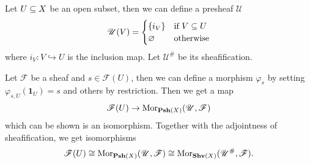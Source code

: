 \begin{example}\label{sheaf by open subset}
Let $U\subseteq X$ be an open subset, then we can define a presheaf $\mathscr{U}$
\[\mathscr{U}(V)=\begin{cases}
\{i_V\}&\text{if }V\subseteq U\\
\varnothing&\text{otherwise}
\end{cases}\]
where $i_V:V\hookrightarrow U$ is the inclusion map. Let $\mathscr{U}^{\#}$ be its sheafification.\par
Let $\mathscr{F}$ be a sheaf and $s\in\mathscr{F}(U)$, then we can define a morphism $\varphi_s$ by setting $\varphi_{s,U}(\mathbf{1}_U)=s$ and others by restriction. Then we get a map
\[\mathscr{F}(U)\to\mathrm{Mor}_{\mathbf{Psh}(X)}(\mathscr{U},\mathscr{F})\]
which can be shown is an isomorphism. Together with the adjointness of sheafification, we get isomorphisms
\[\mathscr{F}(U)\cong\mathrm{Mor}_{\mathbf{Psh}(X)}(\mathscr{U},\mathscr{F})\cong\mathrm{Mor}_{\mathbf{Shv}(X)}(\mathscr{U}^{\#},\mathscr{F}).\]
\end{example}
